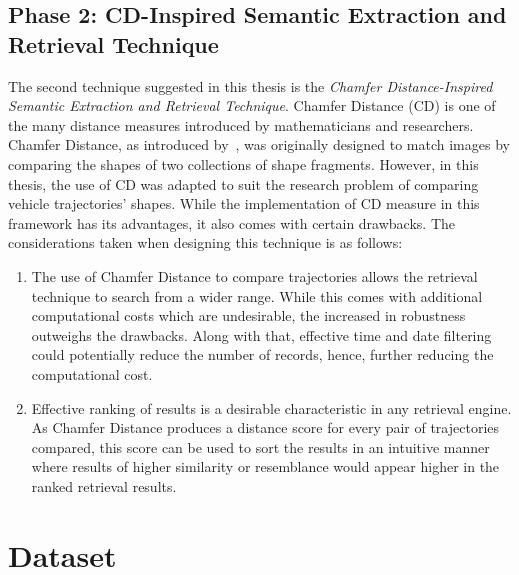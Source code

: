 \subsection{Phase 2: CD-Inspired Semantic Extraction and Retrieval Technique}
The second technique suggested in this thesis is the \textit{Chamfer Distance-Inspired Semantic Extraction and Retrieval Technique}.
Chamfer Distance (CD) is one of the many distance measures %
introduced by mathematicians and researchers. Chamfer Distance, as introduced by~, was originally designed to match images by comparing the shapes of two collections of shape fragments.
However, in this thesis, the use of CD was adapted to suit the research problem of comparing vehicle trajectories' shapes. While the implementation of CD measure in this framework has its advantages, it also comes with certain drawbacks. The considerations taken when designing this technique is as follows:
\begin{enumerate}
    \item The use of Chamfer Distance to compare trajectories allows the retrieval technique to search from a wider range. While this comes with additional computational costs which are undesirable, the increased in robustness outweighs the drawbacks. Along with that, effective time and date filtering could potentially reduce the number of records, hence, further reducing the computational cost.
    \item Effective ranking of results is a desirable characteristic in any retrieval engine. As Chamfer Distance produces a distance score for every pair of trajectories compared, this score can be used to sort the results in an intuitive manner where results of higher similarity or resemblance would appear higher in the ranked retrieval results.
\end{enumerate}


\section{Dataset}
\label{section:dataset_used}


